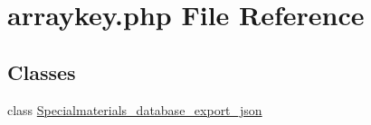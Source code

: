 \hypertarget{arraykey_8php}{\section{arraykey.\+php File Reference}
\label{arraykey_8php}
}
\subsection*{Classes}
\begin{DoxyCompactItemize}
\item 
class \hyperlink{classSpecialmaterials__database__export__json}{Specialmaterials\+\_\+database\+\_\+export\+\_\+json}
\end{DoxyCompactItemize}

